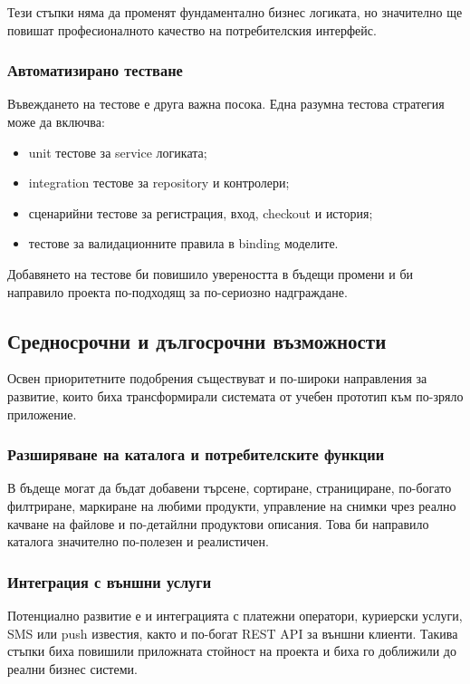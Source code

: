 Тези стъпки няма да променят фундаментално бизнес логиката, но значително ще повишат професионалното качество на потребителския интерфейс.

\subsubsection{Автоматизирано тестване}

Въвеждането на тестове е друга важна посока. Една разумна тестова стратегия може да включва:

\begin{itemize}[leftmargin=*]
    \item unit тестове за service логиката;
    \item integration тестове за repository и контролери;
    \item сценарийни тестове за регистрация, вход, checkout и история;
    \item тестове за валидационните правила в binding моделите.
\end{itemize}

Добавянето на тестове би повишило увереността в бъдещи промени и би направило проекта по-подходящ за по-сериозно надграждане.

\subsection{Средносрочни и дългосрочни възможности}

Освен приоритетните подобрения съществуват и по-широки направления за развитие, които биха трансформирали системата от учебен прототип към по-зряло приложение.

\subsubsection{Разширяване на каталога и потребителските функции}

В бъдеще могат да бъдат добавени търсене, сортиране, странициране, по-богато филтриране, маркиране на любими продукти, управление на снимки чрез реално качване на файлове и по-детайлни продуктови описания. Това би направило каталога значително по-полезен и реалистичен.

\subsubsection{Интеграция с външни услуги}

Потенциално развитие е и интеграцията с платежни оператори, куриерски услуги, SMS или push известия, както и по-богат REST API за външни клиенти. Такива стъпки биха повишили приложната стойност на проекта и биха го доближили до реални бизнес системи.

